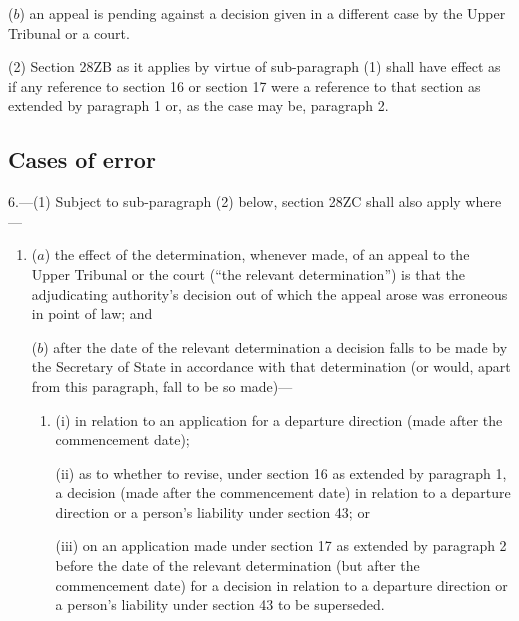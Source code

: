 \documentclass[12pt,a4paper]{article}
\begin{document}
{\begin{enumerate}
($b$) an appeal is pending against a decision given in a different case by the Upper Tribunal or a court.
\end{enumerate}

(2) Section 28ZB as it applies by virtue of sub-paragraph (1) shall have effect as if any reference to section 16 or section 17 were a reference to that section as extended by paragraph 1 or, as the case may be, paragraph 2.


\subsection*{Cases of error}

\begin{sloppypar}
6.---(1) Subject to sub-paragraph (2) below, section 28ZC shall also apply where---
\end{sloppypar}
\begin{enumerate}\item[]
($a$) the effect of the determination, whenever made, of an appeal to the Upper Tribunal or the court (“the relevant determination”) is that the adjudicating authority’s decision out of which the appeal arose was erroneous in point of law; and

($b$) after the date of the relevant determination a decision falls to be made by the Secretary of State in accordance with that determination (or would, apart from this paragraph, fall to be so made)---
\begin{enumerate}\item[]
(i) in relation to an application for a departure direction (made after the commencement date);

(ii) as to whether to revise, under section 16 as extended by paragraph 1, a decision (made after the commencement date) in relation to a departure direction
or a person’s liability under section 43; or

(iii) on an application made under section 17 as extended by paragraph 2 before the date of the relevant determination (but after the commencement date) for a decision in relation to a departure direction
or a person’s liability under section 43 to be superseded.
\end{enumerate}
\end{enumerate}

}
\end{document}
